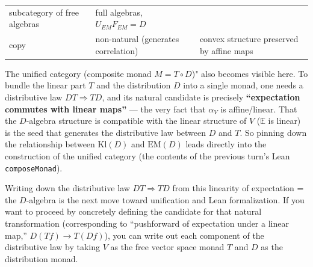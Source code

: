\documentclass[a4paper,11pt]{article}
\begin{document}
\begin{longtable}[]{@{}lll@{}}
\begin{minipage}[t]{0.30\columnwidth}
subcategory of free algebras\strut
\end{minipage} & \begin{minipage}[t]{0.30\columnwidth}\raggedright
full algebras, \(U_{EM}F_{EM}=D\)\strut
\end{minipage}\tabularnewline
\begin{minipage}[t]{0.30\columnwidth}\raggedright
copy\strut
\end{minipage} & \begin{minipage}[t]{0.30\columnwidth}\raggedright
non-natural (generates correlation)\strut
\end{minipage} & \begin{minipage}[t]{0.30\columnwidth}\raggedright
convex structure preserved by affine maps\strut
\end{minipage}\tabularnewline
\bottomrule
\end{longtable}

The unified category (composite monad \(M=T\circ D\))" also becomes
visible here. To bundle the linear part \(T\) and the distribution \(D\)
into a single monad, one needs a distributive law \(DT\Rightarrow TD\),
and its natural candidate is precisely \textbf{``expectation commutes
with linear maps''} --- the very fact that \(\alpha_V\) is
affine/linear. That the \(D\)-algebra structure is compatible with the
linear structure of \(V\) (\(\mathbb E\) is linear) is the seed that
generates the distributive law between \(D\) and \(T\). So pinning down
the relationship between \(\mathrm{Kl}(D)\) and \(\mathrm{EM}(D)\) leads
directly into the construction of the unified category (the contents of
the previous turn's Lean \texttt{composeMonad}).

Writing down the distributive law \(DT\Rightarrow TD\) from this
linearity of expectation = the \(D\)-algebra is the next move toward
unification and Lean formalization. If you want to proceed by concretely
defining the candidate for that natural transformation (corresponding to
``pushforward of expectation under a linear map,'' \(D(Tf)\to T(Df)\)),
you can write out each component of the distributive law by taking \(V\)
as the free vector space monad \(T\) and \(D\) as the distribution monad.
\end{document}
